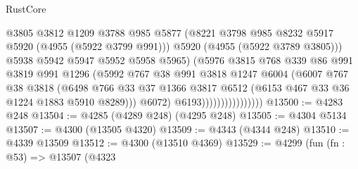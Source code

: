 \begin{lexlean}{RustCore}
\begin{coremodule}
                                      @3805
                                      @3812
                                      @1209
                                      @3788
                                      @985
                                      @5877
                                      (@8221
                                        @3798
                                        @985
                                        @8232
                                        @5917
                                        @5920
                                        (@4955 (@5922 @3799 @991)))
                                      @5920
                                      (@4955 (@5922 @3789 @3805)))
                                    @5938
                                    @5942
                                    @5947
                                    @5952
                                    @5958
                                    @5965)
                                  (@5976
                                    @3815
                                    @768
                                    @339
                                    @86
                                    @991
                                    @3819
                                    @991
                                    @1296
                                    (@5992
                                      @767
                                      @38
                                      @991
                                      @3818
                                      @1247
                                      @6004
                                      (@6007
                                        @767
                                        @38
                                        @3818
                                        (@6498
                                          @766
                                          @33
                                          @37
                                          @1366
                                          @3817
                                          @6512
                                          (@6153 @467 @33 @36 @1224 @1883 @5910 @8289)))
                                      @6072)
                                    @6193))))))))))))))))
@13500 := @4283 @248
@13504 := @4285 (@4289 @248) (@4295 @248)
@13505 := @4304 @5134
@13507 := @4300 (@13505 @4320)
@13509 := @4343 (@4344 @248)
@13510 := @4339 @13509
@13512 := @4300 (@13510 @4369)
@13529 := @4299
    (fun (fn : @53) =>
    @13507
      (@4323

\end{coremodule}
\end{lexlean}
